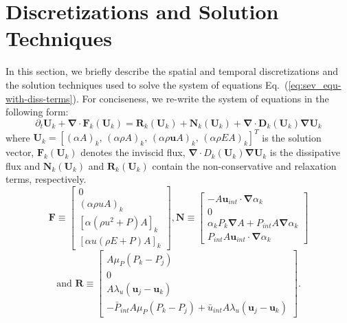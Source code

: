 \documentclass[preprint,10pt]{elsarticle}
\renewcommand{\div}{\mbold{\nabla}\! \cdot \!}
\newcommand{\grad}{\mbold{\nabla}}
\newcommand{\mbold}[1]{\boldsymbol#1}
\newcommand{\eqt}[1]{Eq.~(\ref{#1})}                     %
\begin{document}
\section{Discretizations and Solution Techniques} \label{sec:solution_tech}
In this section, we briefly describe the spatial and temporal discretizations and the solution techniques 
used to solve the system of equations \eqt{eq:sev_equ-with-diss-terms}. For conciseness, we re-write the system of 
equations in the following form:
\begin{equation}
\label{eq:form}
\partial_t \mathbf{U}_k + \div \mathbf{F}_k \left( \mathbf{U}_k \right) = \mathbf{R}_k \left( \mathbf{U}_k \right) + \mathbf{N}_k \left( \mathbf{U}_k \right) + \div \mathbf{D}_k(\mathbf{U}_k) \grad \mathbf{U}_k
\end{equation}
where $\mathbf{U}_k=[(\alpha A )_k, \, (\alpha \rho A)_k,\, (\alpha \rho \mbold{u} A)_k,\, (\alpha \rho E A)_k]^T$ is the solution vector, $\mathbf{F}_k \left( \mathbf{U}_k \right)$ denotes the inviscid flux, $\div D_k (\mathbf{U}_k) \grad \mathbf{U}_k$ is the dissipative flux and $\mathbf{N}_k \left( \mathbf{U}_k \right)$ and $\mathbf{R}_k \left( \mathbf{U}_k \right)$ contain the non-conservative and relaxation terms, respectively. 
\begin{equation}
  \mathbf{F} \equiv
  \begin{bmatrix}
      0     \\
    ( \alpha \rho u A )_k     \\
    \left[ \alpha \left(\rho u^2 + P \right) A \right ]_k  \\
    \left[ \alpha u (\rho E + P) A \right]_k
  \end{bmatrix},
  \mathbf{N} \equiv
  \begin{bmatrix}
      - A \mbold{u}_{int} \cdot \grad \alpha_k     \\
    0     \\
    \alpha_k P_k \grad A + P_{int} A \grad \alpha_k  \\
    P_{int} A \mbold{u}_{int} \cdot \grad \alpha_k
  \end{bmatrix} \nonumber
\end{equation}
\begin{equation}
\text{and }
  \mathbf{R} \equiv
  \begin{bmatrix}
      A \mu_P \left( P_k - P_j \right)     \\
    0     \\
    A \lambda_u \left( \mbold u_j - \mbold u_k \right) \\
    - \bar{P}_{int} A \mu_P \left( P_k - P_j \right) + \bar{u}_{int} A \lambda_u \left( \mbold u_j - \mbold u_k \right)
  \end{bmatrix}. \nonumber
\end{equation}
%
\end{document}
